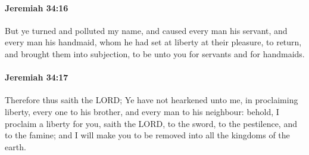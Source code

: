		\paragraph{Jeremiah 34:16} %
			\label{JEREMIAH-34-16}

			But ye turned and polluted my name, and caused every man his servant, and every man his handmaid, whom he had set at liberty at their pleasure, to return, and brought them into subjection, to be unto you for servants and for handmaids.


		\paragraph{Jeremiah 34:17} %
			\label{JEREMIAH-34-17}

			Therefore thus saith the LORD; Ye have not hearkened unto me, in proclaiming liberty, every one to his brother, and every man to his neighbour: behold, I proclaim a liberty for you, saith the LORD, to the sword, to the pestilence, and to the famine; and I will make you to be removed into all the kingdoms of the earth.

